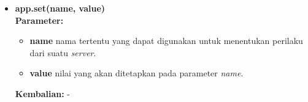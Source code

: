 \begin{itemize}
%	
%		
%	
%	
%	
%	
	\item \textbf{app.set(name, value)} \\
	\textbf{Parameter:}
	\begin{itemize}
		\item \textbf{name} nama tertentu yang dapat digunakan untuk menentukan perilaku dari suatu \textit{server}.
		\item \textbf{value} nilai yang akan ditetapkan pada parameter \textit{name}.
	\end{itemize}
	\textbf{Kembalian:} -
	

\end{itemize}
